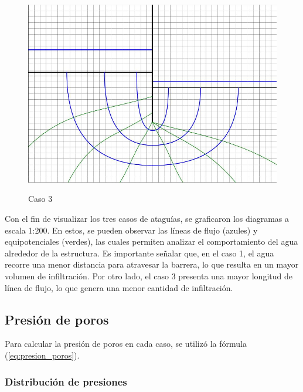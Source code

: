 \begin{figure}[H]
\begin{minipage}{0.32\textwidth}
        \includegraphics[width=\textwidth]{GRAFICOS/caso_3.jpg}
        \caption{Caso 3}
        \label{fig:caso_3}
    \end{minipage}
\end{figure}

Con el fin de visualizar los tres casos de ataguías, se graficaron los diagramas a escala 1:200. En estos, se pueden observar las líneas de flujo (azules) y equipotenciales (verdes), las cuales permiten analizar el comportamiento del agua alrededor de la estructura. Es importante señalar que, en el caso 1, el agua recorre una menor distancia para atravesar la barrera, lo que resulta en un mayor volumen de infiltración. Por otro lado, el caso 3 presenta una mayor longitud de línea de flujo, lo que genera una menor cantidad de infiltración.

\subsection{Presión de poros}
Para calcular la presión de poros en cada caso, se utilizó la fórmula (\ref{eq:presion_poros}). 

\subsubsection{Distribución de presiones}

